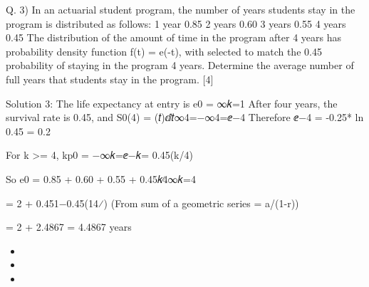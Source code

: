 Q. 3)
In an actuarial student program, the number of years students stay in the program is distributed as follows:
1 year 0.85
2 years 0.60
3 years 0.55
4 years 0.45
The distribution of the amount of time in the program after 4 years has probability density function f(t) = \mu*e(-\mu*t), with \mu selected to match the 0.45 probability of staying in the program 4 years.
Determine the average number of full years that students stay in the program.
[4]


Solution 3:
The life expectancy at entry is e0 = ∞𝑘=1 
After four years, the survival rate is 0.45, and
S0(4) = (𝑡)ⅆ𝑡∞4=\int{}−∞4=ⅇ−4\mu
Therefore ⅇ−4
\mu = -0.25* ln 0.45 = 0.2

For k >= 4,
kp0 = \int{}−∞𝑘=ⅇ−𝑘\mu = 0.45(k/4)

So e0 = 0.85 + 0.60 + 0.55 + \Sum0.45𝑘∕4∞𝑘=4

= 2 + 0.451−0.45(14⁄) (From sum of a geometric series = a/(1-r))

= 2 + 2.4867
= 4.4867 years 

\begin{itemize}
\item 
\item 
\item 
\end{itemize}
